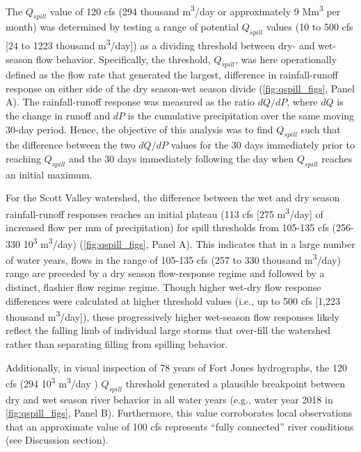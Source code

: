 \documentclass[hess, manuscript]{copernicus}
\begin{document}
The \(Q_{spill}\) value of 120 cfs (294 thousand
m\textsuperscript{3}/day or approximately 9 Mm\textsuperscript{3} per
month) was determined by testing a range of potential \(Q_{spill}\)
values (10 to 500 cfs {[}24 to 1223 thousand
m\textsuperscript{3}/day{]}) as a dividing threshold between dry- and
wet-season flow behavior. Specifically, the threshold, \(Q_{spill}\),
was here operationally defined as the flow rate that generated the
largest, difference in rainfall-runoff response on either side of the
dry season-wet season divide (\autoref{fig:qspill_figs}, Panel A). The
rainfall-runoff response was measured as the ratio \(dQ/dP\), where
\(dQ\) is the change in runoff and \(dP\) is the cumulative
precipitation over the same moving 30-day period. Hence, the objective
of this analysis was to find \(Q_{spill}\) such that the difference
between the two \(dQ/dP\) values for the 30 days immediately prior to
reaching \(Q_{spill}\) and the 30 days immediately following the day
when \(Q_{spill}\) reaches an initial maximum.

For the Scott Valley watershed, the difference between the wet and dry
season rainfall-runoff responses reaches an initial plateau (113 cfs
{[}275 m\textsuperscript{3}/day{]} of increased flow per mm of
precipitation) for spill thresholds from 105-135 cfs (256-330
10\textsuperscript{3} m\textsuperscript{3}/day)
(\autoref{fig:qspill_figs}, Panel A). This indicates that in a large
number of water years, flows in the range of 105-135 cfs (257 to 330
thousand m\textsuperscript{3}/day) range are preceded by a dry season
flow-response regime and followed by a distinct, flashier flow regime
regime. Though higher wet-dry flow response differences were calculated
at higher threshold values (i.e., up to 500 cfs {[}1,223 thousand
m\textsuperscript{3}/day{]}), these progressively higher wet-season flow
responses likely reflect the falling limb of individual large storms
that over-fill the watershed rather than separating filling from
spilling behavior.

Additionally, in visual inspection of 78 years of Fort Jones
hydrographs, the 120 cfs (294 10\textsuperscript{3}
m\textsuperscript{3}/day ) \(Q_{spill}\) threshold generated a plausible
breakpoint between dry and wet season river behavior in all water years
(e.g., water year 2018 in \autoref{fig:qspill_figs}, Panel B).
Furthermore, this value corroborates local observations that an
approximate value of 100 cfs represents ``fully connected'' river
conditions (see Discussion section).
\end{document}
